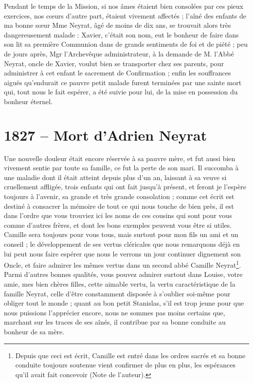 \documentclass[11pt,a4paper]{report}
\begin{document}
Pendant le temps de la Mission, si nos âmes étaient bien consolées par ces pieux exercices, nos cœurs d'autre part, étaient vivement affectés ; l'aîné des enfants de ma bonne sœur Mme Neyrat, âgé de moins de dix ans, se trouvait alors très dangereusement malade : Xavier, c'était son nom, eut le bonheur de faire dans son lit sa première Communion dans de grands sentiments de foi et de piété ; peu de jours après, Mgr l'Archevêque administrateur, à la demande de M. l'Abbé Neyrat, oncle de Xavier, voulut bien se transporter chez ses parents, pour administrer à cet enfant le sacrement de Confirmation ; enfin les souffrances aiguës qu'endurait ce pauvre petit malade furent terminées par une sainte mort qui, tout nous le fait espérer, a été suivie pour lui, de la mise en possession du bonheur éternel.

\section*{1827 -- Mort d'Adrien Neyrat}

Une nouvelle douleur était encore réservée à sa pauvre mère, et fut aussi bien vivement sentie par toute sa famille, ce fut la perte de son mari. Il succomba à une maladie dont il était atteint depuis plus d'un an, laissant à sa veuve si cruellement affligée, trois enfants qui ont fait jusqu'à présent, et feront je l'espère toujours à l'avenir, sa grande et très grande consolation ; comme cet écrit est destiné à consacrer la mémoire de tout ce qui nous touche de bien près, il est dans l'ordre que vous trouviez ici les noms de ces cousins qui sont pour vous comme d'autres frères, et dont les bons exemples peuvent vous être si utiles. Camille sera toujours pour vous tous, mais surtout pour mon fils un ami et un conseil ; le développement de ses vertus cléricales que nous remarquons déjà en lui peut nous faire espérer que nous le verrons un jour continuer dignement son Oncle, et faire admirer les mêmes vertus dans un second abbé Camille Neyrat\footnote{Depuis que ceci est écrit, Camille est entré dans les ordres sacrés et sa bonne conduite toujours soutenue vient confirmer de plus en plus, les espérances qu'il avait fait concevoir (Note de l'auteur).}. Parmi d'autres bonnes qualités, vous pouvez admirer surtout dans Louise, votre amie, mes bien chères filles, cette aimable vertu, la vertu caractéristique de la famille Neyrat, celle d'être constamment disposée à s'oublier soi-même pour obliger tout le monde ; quant au bon petit Stanislas, s'il est trop jeune pour que nous puissions l'apprécier encore, nous ne sommes pas moins certains que, marchant sur les traces de ses aînés, il contribue par sa bonne conduite au bonheur de sa mère.
\end{document}
